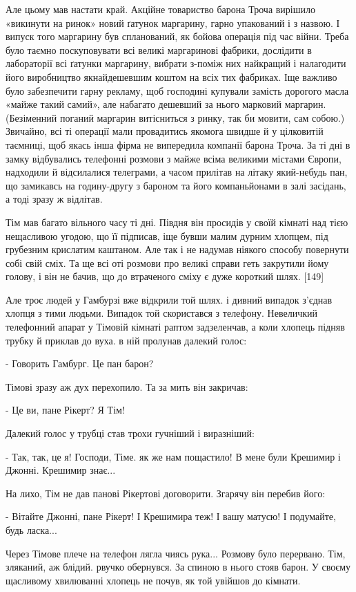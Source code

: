 Але цьому мав настати край. Акційне товариство барона Троча вирішило «викинути на ринок» новий ґатунок маргарину, гарно упакований і з назвою. І випуск того маргарину був спланований, як бойова операція під час війни. Треба було таємно поскуповувати всі великі маргаринові фабрики, дослідити в лабораторії всі ґатунки маргарину, вибрати з-поміж них найкращий і налагодити його виробництво якнайдешевшим коштом на всіх тих фабриках. Іще важливо було забезпечити гарну рекламу, щоб господині купували замість дорогого масла «майже такий самий», але набагато дешевший за нього марковий маргарин. (Безіменний поганий маргарин витісниться з ринку, так би мовити, сам собою.) Звичайно, всі ті операції мали провадитись якомога швидше й у цілковитій таємниці, щоб якась інша фірма не випередила компанії барона Троча. За ті дні в замку відбувались телефонні розмови з майже всіма великими містами Європи, надходили й відсилалися телеграми, а часом прилітав на літаку який-небудь пан, що замикавсь на годину-другу з бароном та його компаньйонами в залі засідань, а тоді зразу ж відлітав.

Тім мав багато вільного часу ті дні. Півдня він просидів у своїй кімнаті над тією нещасливою угодою, що її підписав, іще бувши малим дурним хлопцем, під грубезним крислатим каштаном. Але так і не надумав ніякого способу повернути собі свій сміх. Та ще всі оті розмови про великі справи геть закрутили йому голову, і він не бачив, що до втраченого сміху є дуже короткий шлях. [149]

Але троє людей у Гамбурзі вже відкрили той шлях. і дивний випадок з'єднав хлопця з тими людьми. Випадок той скористався з телефону. Невеличкий телефонний апарат у Тімовій кімнаті раптом задзеленчав, а коли хлопець підняв трубку й приклав до вуха. в ній пролунав далекий голос:

- Говорить Гамбург. Це пан барон?

Тімові зразу аж дух перехопило. Та за мить він закричав:

- Це ви, пане Рікерт? Я Тім!

Далекий голос у трубці став трохи гучніший і виразніший:

- Так, так, це я! Господи, Тіме. як же нам пощастило! В мене були Крешимир і Джонні. Крешимир знає...

На лихо, Тім не дав панові Рікертові договорити. Згарячу він перебив його:

- Вітайте Джонні, пане Рікерт! І Крешимира теж! І вашу матусю! І подумайте, будь ласка...

Через Тімове плече на телефон лягла чиясь рука... Розмову було перервано. Тім, зляканий, аж блідий. рвучко обернувся. За спиною в нього стояв барон. У своєму щасливому хвилюванні хлопець не почув, як той увійшов до кімнати.

